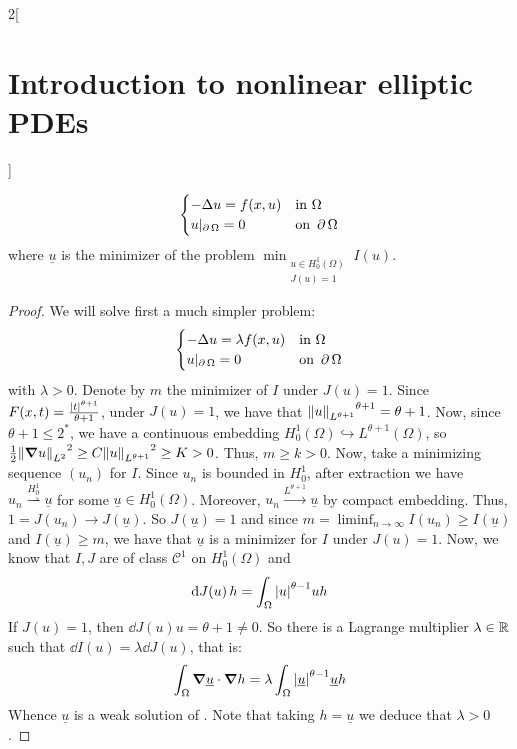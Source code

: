\documentclass[../../../main_math.tex]{subfiles}
\begin{document}
\begin{multicols}{2}[\section{Introduction to nonlinear elliptic PDEs}]
\begin{proposition}[Aplication]
\begin{equation}
      \begin{cases}
        -\Delta u=f(x,u) & \text{in }\Omega      \\
        u|_{\operatorname{\partial}{\Omega}}=0   & \text{on }\operatorname{\partial}{\Omega}
      \end{cases}
    \end{equation}
    where $\underline{u}$ is the minimizer of the problem
    $\displaystyle
      \min_{\substack{u\in H_0^1(\Omega) \\ J(u)=1}}I(u)
    $.
  \end{proposition}
  \begin{proof}
    We will solve first a much simpler problem:
    \begin{equation}\label{INEPDE:aux_problem_lagrange}
      \begin{cases}
        -\Delta u=\lambda f(x,u) & \text{in }\Omega      \\
        u|_{\operatorname{\partial}{\Omega}}=0           & \text{on }\operatorname{\partial}{\Omega}
      \end{cases}
    \end{equation}
    with $\lambda>0$. Denote by $m$ the minimizer of $I$ under $J(u)=1$. Since $F(x,t)=\frac{\abs{t}^{\theta+1}}{\theta+1}$, under $J(u)=1$, we have that ${\left\|u\right\|_{L^{\theta+1}}}^{\theta+1}=\theta+1$. Now, since $\theta+1\leq 2^*$, we have a continuous embedding $H_0^1(\Omega)\hookrightarrow L^{\theta+1}(\Omega)$, so $\frac{1}{2}{\left\|\grad u\right\|_{L^2}}^2\geq C {\left\|u\right\|_{L^{\theta+1}}}^2\geq K>0$. Thus, $m\geq k>0$. Now, take a minimizing sequence $(u_n)$ for $I$. Since $u_n$ is bounded in $H_0^1$, after extraction we have $u_n\overset{H_0^1}{\rightharpoonup} \underline{u}$ for some $\underline{u}\in H_0^1(\Omega)$. Moreover, $u_n\overset{L^{\theta+1}}{\to} \underline{u}$ by compact embedding. Thus, $1=J(u_n)\to J(\underline{u})$. So $J(\underline{u})=1$ and since $m=\displaystyle\liminf_{n\to\infty}I(u_n)\geq I(\underline{u})$ and $I(\underline{u})\geq m$, we have that $\underline{u}$ is a minimizer for $I$ under $J(u)=1$. Now, we know that $I,J$ are of class $\mathcal{C}^1$ on $H_0^1(\Omega)$ and
    $$
      \dd{J(u)}h = \int_\Omega \abs{u}^{\theta-1}uh
    $$
    If $J(u)=1$, then $\dd{J(u)}u=\theta+1\ne 0$. So there is a Lagrange multiplier $\lambda\in\mathbb{R}$ such that $\dd{I(u)}=\lambda \dd{J(u)}$, that is:
    $$
      \int_\Omega \grad \underline{u}\cdot \grad h=\lambda \int_\Omega \abs{\underline{u}}^{\theta-1}\underline{u}h
    $$
    Whence $\underline{u}$ is a weak solution of . Note that taking $h=\underline{u}$ we deduce that $\lambda>0$.


\end{proof}
\end{multicols}
\end{document}
